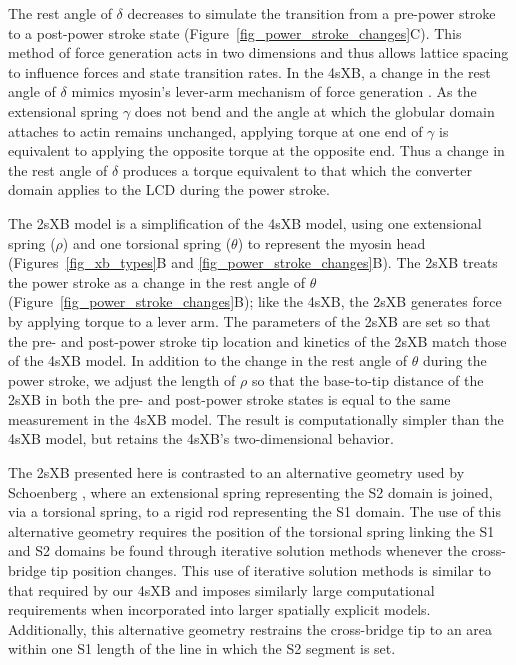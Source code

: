 \documentclass[10pt]{article}
\newcommand{\citep}[1]{\cite{#1}} %
\begin{document}
The rest angle of $\delta$ decreases to simulate the transition from a pre-power stroke to a post-power stroke state (Figure~\ref{fig_power_stroke_changes}C).
This method of force generation acts in two dimensions and thus allows lattice spacing to influence forces and state transition rates. 
In the 4sXB, a change in the rest angle of $\delta$ mimics myosin's lever-arm mechanism of force generation \citep{Houdusse2000, Houdusse2001}. 
As the extensional spring $\gamma$ does not bend and the angle at which the globular domain attaches to actin remains unchanged, applying torque at one end of $\gamma$ is equivalent to applying the opposite torque at the opposite end.
Thus a change in the rest angle of $\delta$ produces a torque equivalent to that which the converter domain applies to the LCD during the power stroke.

The 2sXB model is a simplification of the 4sXB model, using one extensional spring ($\rho$) and one torsional spring ($\theta$) to represent the myosin head (Figures~\ref{fig_xb_types}B and \ref{fig_power_stroke_changes}B).
The 2sXB treats the power stroke as a change in the rest angle of $\theta$ (Figure~\ref{fig_power_stroke_changes}B); like the 4sXB, the 2sXB generates force by applying torque to a lever arm.
The parameters of the 2sXB are set so that the pre- and post-power stroke tip location and kinetics of the 2sXB match those of the 4sXB model. 
In addition to the change in the rest angle of $\theta$ during the power stroke, we adjust the length of $\rho$ so that the base-to-tip distance of the 2sXB in both the pre- and post-power stroke states is equal to the same measurement in the 4sXB model.
The result is computationally simpler than the 4sXB model, but retains the 4sXB's two-dimensional behavior.

The 2sXB presented here is contrasted to an alternative geometry used by Schoenberg \citep{Schoenberg1980a, Schoenberg1980b}, where an extensional spring representing the S2 domain is joined, via a torsional spring, to a rigid rod representing the S1 domain.
The use of this alternative geometry requires the position of the torsional spring linking the S1 and S2 domains be found through iterative solution methods whenever the cross-bridge tip position changes. 
This use of iterative solution methods is similar to that required by our 4sXB and imposes similarly large computational requirements when incorporated into larger spatially explicit models. 
Additionally, this alternative geometry restrains the cross-bridge tip to an area within one S1 length of the line in which the S2 segment is set.
\end{document}

